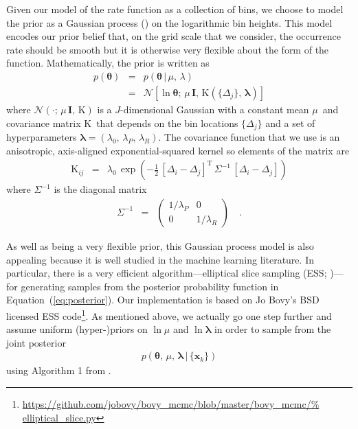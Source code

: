 \documentclass[12pt,preprint]{aastex}
\newcommand{\Eq}[1]{Equation~(\ref{eq:#1})}
\newcommand{\eq}[1]{\Eq{#1}}
\newcommand{\bvec}[1]{\ensuremath{\boldsymbol{#1}}}
\newcommand{\ratepar}{{\ensuremath{\theta}}}
\newcommand{\ratepars}{{\ensuremath{\bvec{\ratepar}}}}
\newcommand{\radius}{\ensuremath{R}}
\newcommand{\period}{\ensuremath{P}}
\newcommand{\data}{{\ensuremath{\bvec{x}}}}
\newcommand{\binarea}{{\ensuremath{\Delta}}}
\newcommand{\mean}{{\ensuremath{\mu}}}
\newcommand{\smooth}{{\ensuremath{\lambda}}}
\newcommand{\smoothpars}{{\ensuremath{\bvec{\smooth}}}}
\newcommand{\cov}{{\ensuremath{\mathrm{K}}}}
\begin{document}
Given our model of the rate function as a collection of bins, we choose to
model the prior as a Gaussian process (\citealt{gp,gibson-gp}) on the
logarithmic bin heights.
This model encodes our prior belief that, on the grid scale that we consider,
the occurrence rate should be smooth but it is otherwise very flexible about
the form of the function.
Mathematically, the prior is written as
\begin{eqnarray}
p(\ratepars) &=& p(\ratepars\,|\,\mean,\,\smooth) \\
&=& \mathcal{N} \left[\ln\ratepars;\,\mean\,\bvec{I},\,
\cov(\{\binarea_j\},\,\smoothpars)\right]
\end{eqnarray}
where $\mathcal{N}(\cdot;\,\mean\,\bvec{I},\,\cov)$ is a $J$-dimensional
Gaussian with a constant mean \mean\ and covariance matrix \cov\ that depends
on the bin locations $\{\binarea_j\}$ and a set of hyperparameters
$\smoothpars = (\smooth_0,\,\smooth_\period,\,\smooth_\radius)$.
The covariance function that we use is an anisotropic, axis-aligned
exponential-squared kernel so elements of the matrix are
\begin{eqnarray}
\cov_{ij} &=& \smooth_0\,\exp\left(-\frac{1}{2}\,
    [\binarea_i-\binarea_j]^\mathrm{T}\,\Sigma^{-1}\,[\binarea_i-\binarea_j]
\right)
\end{eqnarray}
where $\Sigma^{-1}$ is the diagonal matrix
\begin{eqnarray}
\Sigma^{-1} &=& \left(\begin{array}{cc}
1/\smooth_\period & 0 \\
0 & 1/\smooth_\radius
\end{array}\right) \quad.
\end{eqnarray}

As well as being a very flexible prior, this Gaussian process model is also
appealing because it is well studied in the machine learning literature.
In particular, there is a very efficient algorithm---elliptical slice sampling
(ESS; \citealt{ess})---for generating samples from the posterior probability
function in \eq{posterior}.
Our implementation is based on Jo Bovy's BSD licensed ESS
code\footnote{\url{https://github.com/jobovy/bovy_mcmc/blob/master/bovy_mcmc/%
elliptical_slice.py}}.
As mentioned above, we actually go one step further and assume uniform
(hyper-)priors on $\ln\mean$ and $\ln\smoothpars$ in order to sample from the
joint posterior
\begin{eqnarray}
p(\ratepars,\,\mean,\,\smoothpars\,|\,\{\data_k\})
\end{eqnarray}
using Algorithm 1 from \citet{ess-hyper}.
\end{document}
